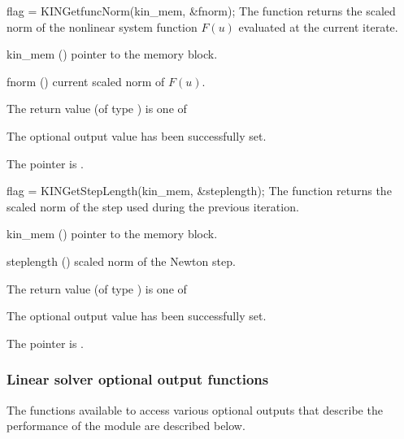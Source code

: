 {}
{
  flag = KINGetfuncNorm(kin\_mem, \&fnorm);
}
{
  The function  returns the scaled norm of the 
  nonlinear system function $F(u)$ evaluated at the current iterate.
}
{
  \begin{args}
  \item[kin\_mem] ()
    pointer to the {\kinsol} memory block.
  \item[fnorm] ()
    current scaled norm of $F(u)$.
  \end{args}
}
{
  The return value  (of type ) is one of
  \begin{args}
  \item[\Id{KIN\_SUCCESS}] 
    The optional output value has been successfully set.
  \item[\Id{KIN\_MEM\_NULL}]
    The  pointer is .
  \end{args}
}
{}
{
  flag = KINGetStepLength(kin\_mem, \&steplength);
}
{
  The function  returns the scaled norm of
  the step used during the previous iteration.
}
{
  \begin{args}[steplength]
  \item[kin\_mem] ()
    pointer to the {\kinsol} memory block.
  \item[steplength] ()
    scaled norm of the Newton step.
  \end{args}
}
{
  The return value  (of type ) is one of
  \begin{args}
  \item[\Id{KIN\_SUCCESS}] 
    The optional output value has been successfully set.
  \item[\Id{KIN\_MEM\_NULL}]
    The  pointer is .
  \end{args}
}
{}
\subsubsection{Linear solver optional output functions}\label{sss:linsolv_io}
The functions available to access various optional outputs that describe the 
performance of the {\kinspgmr} module are described below.

